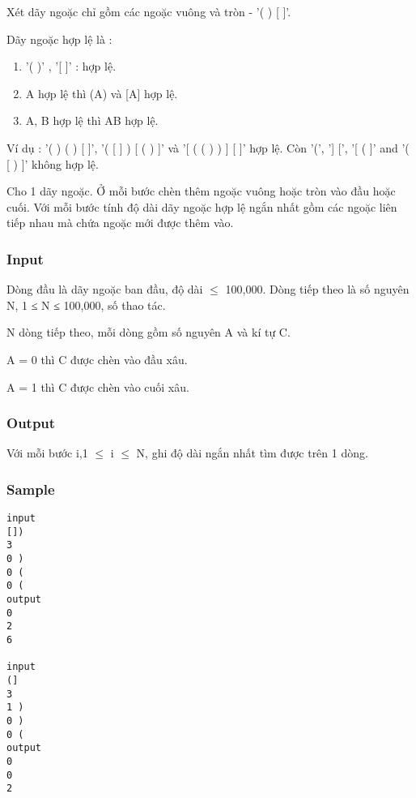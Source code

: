 

Xét dãy ngoặc chỉ gồm các ngoặc vuông và tròn - '( ) [ ]'.

Dãy ngoặc hợp lệ là :
\begin{enumerate}
	\item '( )' , '[ ]' : hợp lệ.
	\item A hợp lệ thì (A) và [A] hợp lệ.
	\item A, B hợp lệ thì AB hợp lệ.
\end{enumerate}

Ví dụ : '( ) ( ) [ ]', '( [ ] ) [ ( ) ]' và '[ ( ( ) ) ] [ ]' hợp lệ. Còn '(', '] [', '[ ( ]' and '( [ ) ]' không hợp lệ.

Cho 1 dãy ngoặc. Ở mỗi bước chèn thêm ngoặc vuông hoặc tròn vào đầu hoặc cuối. Với mỗi bước tính độ dài dãy ngoặc hợp lệ ngắn nhất gồm các ngoặc liên tiếp nhau mà chứa ngoặc mới được thêm vào.

\subsubsection{Input}

Dòng đầu là dãy ngoặc ban đầu, độ dài  $\le$  100,000. Dòng tiếp theo là số nguyên N, 1 ≤ N ≤ 100,000, số thao tác.





N dòng tiếp theo, mỗi dòng gồm số nguyên A và kí tự C.


A = 0 thì C được chèn vào đầu xâu.


A = 1 thì C được chèn vào cuối xâu.

\subsubsection{Output}

Với mỗi bước i,1  $\le$  i  $\le$  N, ghi độ dài ngắn nhất tìm được trên 1 dòng.

\subsubsection{Sample}
\begin{verbatim}
input 
[]) 
3 
0 ) 
0 ( 
0 ( 
output 
0 
2 
6 

input 
(] 
3 
1 ) 
0 ) 
0 ( 
output 
0 
0 
2 
\end{verbatim}

 
